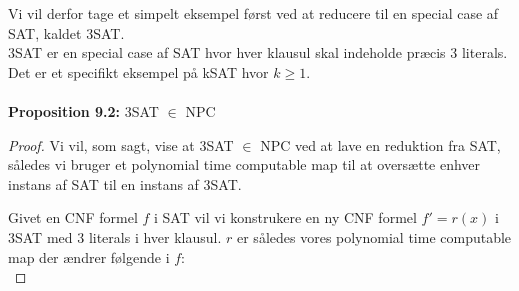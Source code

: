 Vi vil derfor tage et simpelt eksempel først ved at reducere til en special case af SAT, kaldet 3SAT.\\
3SAT er en special case af SAT hvor hver klausul skal indeholde præcis 3 literals. Det er et specifikt eksempel på kSAT hvor $k \geq 1$.\\
~\\
\textbf{Proposition 9.2:} 3SAT $\in$ NPC

\begin{proof}
 Vi vil, som sagt, vise at 3SAT $\in$ NPC ved at lave en reduktion fra SAT, således vi bruger et polynomial time computable map til at oversætte enhver instans af SAT til en instans af 3SAT. 

Givet en CNF formel $f$ i SAT vil vi konstrukere en ny CNF formel $f' = r(x)$ i 3SAT med 3 literals i hver klausul. $r$ er således vores polynomial time computable map der ændrer følgende i $f$:\\


\end{proof}
